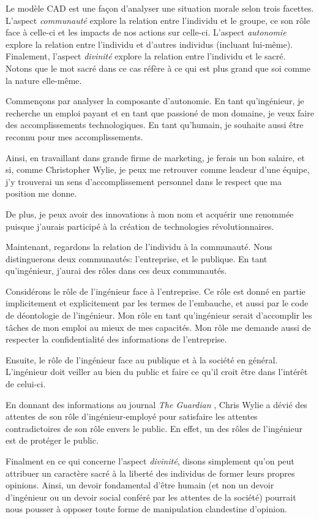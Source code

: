 \documentclass[11pt]{article}
\begin{document}
Le modèle CAD est une façon d'analyser une situation morale selon trois
facettes.  L'aspect \emph{communauté} explore la relation entre l'individu et le
groupe, ce son rôle face à celle-ci et les impacts de nos actions sur celle-ci.
L'aspect \emph{autonomie} explore la relation entre l'individu et d'autres individus
(incluant lui-même).
Finalement, l'aspect \emph{divinité} explore la relation entre l'individu et le
sacré.  Notons que le mot sacré dans ce cas réfère à ce qui est plus grand que
soi comme la nature elle-même.

Commençons par analyser la composante d'autonomie.  En tant qu'ingénieur, je
recherche un emploi payant et en tant que passioné de mon domaine, je veux faire
des accomplissements technologiques.  En tant qu'humain, je souhaite aussi être
reconnu pour mes accomplissements.

Ainsi, en travaillant dans grande firme de marketing, je ferais un bon salaire,
et si, comme Christopher Wylie, je peux me retrouver comme leadeur d'une équipe,
j'y trouverai un sens d'accomplissement personnel dans le respect que ma
position me donne.

De plus, je peux avoir des innovations à mon nom et acquérir une renommée
puisque j'aurais participé à la création de technologies révolutionnaires.

Maintenant, regardons la relation de l'individu à la communauté.  Nous
distinguerons deux communautés: l'entreprise, et le publique.  En tant
qu'ingénieur, j'aurai des rôles dans ces deux communautés.

Considérons le rôle de l'ingénieur face à l'entreprise.  Ce rôle est donné en
partie implicitement et explicitement par les termes de l'embauche, et aussi par
le code de déontologie de l'ingénieur.  Mon rôle en tant qu'ingénieur serait
d'accomplir les tâches de mon emploi au mieux de mes capacités.  Mon rôle me
demande aussi de respecter la confidentialité des informations de l'entreprise.

Ensuite, le rôle de l'ingénieur face au publique et à la société en général.
L'ingénieur doit veiller au bien du public et faire ce qu'il croit être dans
l'intérêt de celui-ci.  

En donnant des informations au journal \emph{ The Guardian },
Chris Wylie a dévié des attentes de son rôle d'ingénieur-employé pour satisfaire les
attentes contradictoires de son rôle envers le public.  En effet, un des rôles
de l'ingénieur est de protéger le public.

Finalment en ce qui concerne l'aspect \emph{divinité}, disons simplement qu'on
peut attribuer un caractère sacré à la liberté des individus de former leurs
propres opinions.  Ainsi, un devoir fondamental d'être humain (et non un devoir
d'ingénieur ou un devoir social conféré par les attentes de la société) pourrait
nous pousser à opposer toute forme de manipulation clandestine d'opinion.
\end{document}
